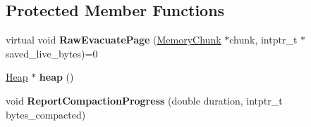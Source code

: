 \subsection*{Protected Member Functions}
\begin{DoxyCompactItemize}
\item 
\mbox{\label{classv8_1_1internal_1_1Evacuator_aa3eb7d2a0acf66ffa6306d4af1abb784}} 
virtual void {\bfseries Raw\+Evacuate\+Page} (\mbox{\hyperlink{classv8_1_1internal_1_1MemoryChunk}{Memory\+Chunk}} $\ast$chunk, intptr\+\_\+t $\ast$saved\+\_\+live\+\_\+bytes)=0
\item 
\mbox{\label{classv8_1_1internal_1_1Evacuator_a49f82f5ab43f4a9644a4b74aa0494085}} 
\mbox{\hyperlink{classv8_1_1internal_1_1Heap}{Heap}} $\ast$ {\bfseries heap} ()
\item 
\mbox{\label{classv8_1_1internal_1_1Evacuator_ace3364584e04bb959c0969999c820b7f}} 
void {\bfseries Report\+Compaction\+Progress} (double duration, intptr\+\_\+t bytes\+\_\+compacted)
\end{DoxyCompactItemize}
